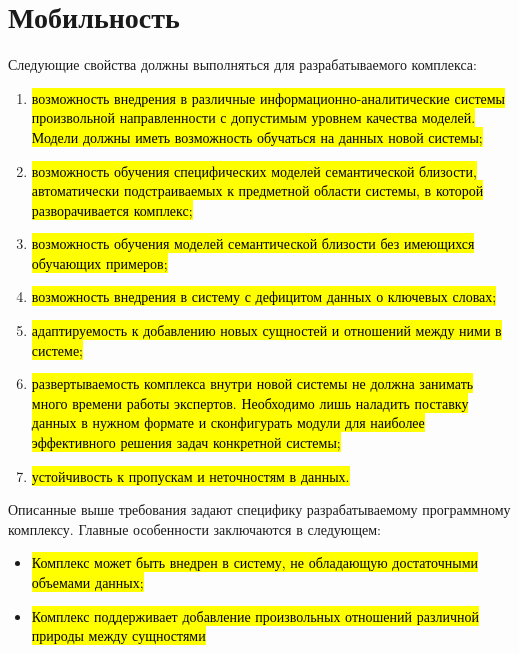 \section{Мобильность}
Следующие свойства должны выполняться для разрабатываемого комплекса:
\begin{enumerate}
    \item \hl{возможность внедрения в различные информационно-аналитические системы произвольной направленности с допустимым уровнем качества моделей. Модели должны иметь возможность обучаться на данных новой системы;}
    \item \hl{возможность обучения специфических моделей семантической близости, автоматически подстраиваемых к предметной области системы, в которой разворачивается комплекс;}
    \item \hl{возможность обучения моделей семантической близости без имеющихся обучающих примеров;}
    \item \hl{возможность внедрения в систему с дефицитом данных о ключевых словах;}
    \item \hl{адаптируемость к добавлению новых сущностей и отношений между ними в системе;}
    \item \hl{развертываемость комплекса внутри новой системы не должна занимать много времени работы экспертов. Необходимо лишь наладить поставку данных в нужном формате и сконфигурать модули для наиболее эффективного решения задач конкретной системы;}
    \item \hl{устойчивость к пропускам и неточностям в данных.}
\end{enumerate}

Описанные выше требования задают специфику разрабатываемому программному комплексу. Главные особенности заключаются в следующем:
\begin{itemize}
    \item \hl{Комплекс может быть внедрен в систему, не обладающую достаточными объемами данных;}
    \item \hl{Комплекс поддерживает добавление произвольных отношений различной природы между сущностями}
\end{itemize}

